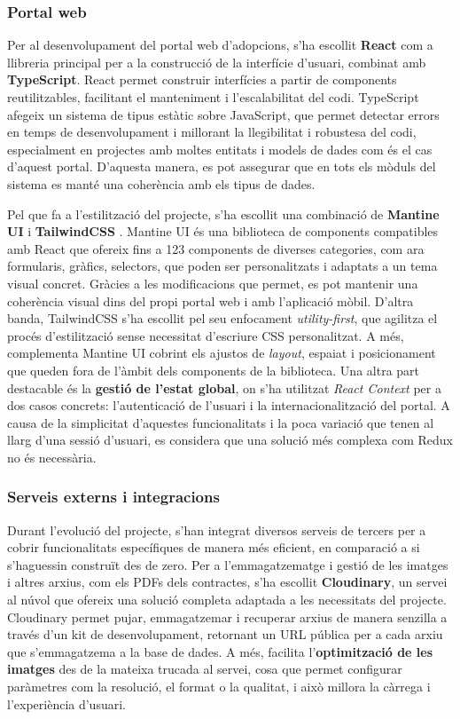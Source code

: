 \documentclass[11pt,a4paper]{report}
\begin{document}
\subsubsection{Portal web}
Per al desenvolupament del portal web d'adopcions, s'ha escollit \textbf{React} com a llibreria principal per a la construcció de la interfície d'usuari, combinat amb \textbf{TypeScript}. React permet construir interfícies a partir de components reutilitzables, facilitant el manteniment i l'escalabilitat del codi. TypeScript afegeix un sistema de tipus estàtic sobre JavaScript, que permet detectar errors en temps de desenvolupament i millorant la llegibilitat i robustesa del codi, especialment en projectes amb moltes entitats i models de dades com és el cas d'aquest portal. D'aquesta manera, es pot assegurar que en tots els mòduls del sistema es manté una coherència amb els tipus de dades.

Pel que fa a l'estilització del projecte, s'ha escollit una combinació de \textbf{Mantine UI} \cite{noauthor_mantine_nodate} i \textbf{TailwindCSS} \cite{noauthor_tailwind_nodate}. Mantine UI és una biblioteca de components compatibles amb React que ofereix fins a 123 components de diverses categories, com ara formularis, gràfics, selectors, que poden ser personalitzats i adaptats a un tema visual concret. Gràcies a les modificacions que permet, es pot mantenir una coherència visual dins del propi portal web i amb l'aplicació mòbil.
D'altra banda, TailwindCSS s'ha escollit pel seu enfocament \textit{utility-first}, que agilitza el procés d'estilització sense necessitat d'escriure CSS personalitzat. A més, complementa Mantine UI cobrint els ajustos de \textit{layout}, espaiat i posicionament que queden fora de l'àmbit dels components de la biblioteca.
Una altra part destacable és la \textbf{gestió de l'estat global}, on s'ha utilitzat \textit{React Context} \cite{noauthor_passing_nodate} per a dos casos concrets: l'autenticació de l'usuari i la internacionalització del portal. A causa de la simplicitat d'aquestes funcionalitats i la poca variació que tenen al llarg d'una sessió d'usuari, es considera que una solució més complexa com Redux no és necessària.

\subsubsection{Serveis externs i integracions}
Durant l'evolució del projecte, s'han integrat diversos serveis de tercers per a cobrir funcionalitats específiques de manera més eficient, en comparació a si s'haguessin construït des de zero.
Per a l'emmagatzematge i gestió de les imatges i altres arxius, com els PDFs dels contractes, s'ha escollit \textbf{Cloudinary}, un servei al núvol que ofereix una solució completa adaptada a les necessitats del projecte. Cloudinary permet pujar, emmagatzemar i recuperar arxius de manera senzilla a través d'un kit de desenvolupament, retornant un URL pública per a cada arxiu que s'emmagatzema a la base de dades. A més, facilita l'\textbf{optimització de les imatges} des de la mateixa trucada al servei, cosa que permet configurar paràmetres com la resolució, el format o la qualitat, i això millora la càrrega i l'experiència d'usuari.
\end{document}
